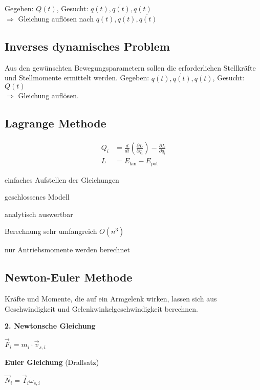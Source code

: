 Gegeben: $Q(t)$, Gesucht: $q(t), \dot{q(t)}, \ddot{q(t)}$ \\
$\Rightarrow$ Gleichung auflösen nach $q(t), \dot{q(t)}, \ddot{q(t)}$
\subsection{Inverses dynamisches Problem}
Aus den gewünschten Bewegungsparametern sollen die erforderlichen Stellkräfte und Stellmomente ermittelt
werden.
Gegeben: $q(t), \dot{q(t)}, \ddot{q(t)}$, Gesucht: $Q(t)$\\
$\Rightarrow$ Gleichung auflösen.

\subsection{Lagrange Methode}
\begin{align}
    Q_i &= \frac{d}{dt}(\frac{\partial L}{\partial \dot{q}_i}) - \frac{\partial L}{\partial q_i} \\
    L &= E_\text{kin} - E_\text{pot}
\end{align}
\begin{compactitem}
    \item einfaches Aufstellen der Gleichungen
    \item geschlossenes Modell
    \item analytisch auswertbar
    \item Berechnung sehr umfangreich $O(n^3)$
    \item nur Antriebsmomente werden berechnet
\end{compactitem}
\subsection{Newton-Euler Methode}
Kräfte und Momente, die auf ein Armgelenk wirken, lassen sich aus Geschwindigkeit und
Gelenkwinkelgeschwindigkeit berechnen.
\begin{compactitem}
    \item \textbf{2. Newtonsche Gleichung}
    \begin{asparaitem}
        \item $\vec{F}_i = m_i \cdot \vec{v}_{s,i}$
    \end{asparaitem}
    \item \textbf{Euler Gleichung} (Drallsatz)
    \begin{asparaitem}
        \item $\vec{N}_i = \vec{I}_i\dot{\omega}_{s,i}$
    \end{asparaitem}
\end{compactitem}


